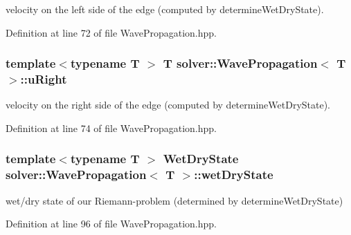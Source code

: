 velocity on the left side of the edge (computed by determine\+Wet\+Dry\+State). 



Definition at line 72 of file Wave\+Propagation.\+hpp.

\subsubsection[{\texorpdfstring{u\+Right}{uRight}}]{\setlength{\rightskip}{0pt plus 5cm}template$<$typename T $>$ T {\bf solver\+::\+Wave\+Propagation}$<$ T $>$\+::u\+Right\hspace{0.3cm}{\ttfamily [protected]}}\hypertarget{classsolver_1_1WavePropagation_a9689ef10a5ad6ab07054a34c9cdcc678}{}\label{classsolver_1_1WavePropagation_a9689ef10a5ad6ab07054a34c9cdcc678}


velocity on the right side of the edge (computed by determine\+Wet\+Dry\+State). 



Definition at line 74 of file Wave\+Propagation.\+hpp.

\subsubsection[{\texorpdfstring{wet\+Dry\+State}{wetDryState}}]{\setlength{\rightskip}{0pt plus 5cm}template$<$typename T $>$ {\bf Wet\+Dry\+State} {\bf solver\+::\+Wave\+Propagation}$<$ T $>$\+::wet\+Dry\+State\hspace{0.3cm}{\ttfamily [protected]}}\hypertarget{classsolver_1_1WavePropagation_a5765dc8464b2046ac74631819b22c9eb}{}\label{classsolver_1_1WavePropagation_a5765dc8464b2046ac74631819b22c9eb}


wet/dry state of our Riemann-\/problem (determined by determine\+Wet\+Dry\+State) 



Definition at line 96 of file Wave\+Propagation.\+hpp.

